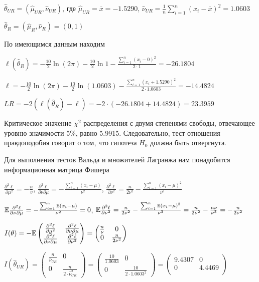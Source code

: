 \begin{problem}
\begin{sol}
$\hat{\theta}_{UR} = (\hat{\mu}_{UR}, \hat{\nu}_{UR})$, где $\hat{\mu}_{UR} = \overline{x} = -1.5290$, $\hat{\nu}_{UR} = \frac{1}{n} \sum_{i=1}^n (x_i - \overline{x})^2 = 1.0603$

$\hat{\theta}_{R} = (\hat{\mu}_{R}, \hat{\nu}_{R}) = (0,1)$

По имеющимся данным находим

$\ell(\hat{\theta}_{R}) = -\frac{10}{2} \ln(2\pi) - \frac{10}{2} \ln 1 - \frac{\sum_{i=1}^n (x_i - 0)^2}{2 \cdot 1} = -26.1804$

$\ell = -\frac{10}{2} \ln(2\pi) -  \frac{10}{2} \ln (1.0603) - \frac{\sum_{i=1}^n (x_i + 1.5290)^2}{2 \cdot 1.0603} = -14.4824$

$LR = -2(\ell(\hat{\theta}_{R}) - \ell) = -2 \cdot (-26.1804 + 14.4824) = 23.3959$

Критическое значение $\chi^2$ распределения с двумя степенями свободы, отвечающее уровню значимости 5\%, равно 5.9915. Следовательно, тест отношения правдоподобия говорит о том, что гипотеза $H_0$ должна быть отвергнута.

Для выполнения тестов Вальда и множителей Лагранжа нам понадобится информационная матрица Фишера

$\frac{\partial^2 \ell}{\partial \mu^2} = -\frac{n}{v}$, $\frac{\partial^2 \ell}{\partial \nu \partial \mu} = -\frac{\sum_{i=1}^n (x_i - \mu)}{\nu^2}$, $\frac{\partial^2 \ell}{\partial \nu^2} = \frac{n}{2\nu^2} - \frac{\sum_{i=1}^n (x_i - \mu)^2}{\nu^3}$

$\mathbb{E} \frac{\partial^2 \ell}{\partial \nu \partial \mu} = -\frac{\sum_{i=1}^n \mathbb{E}(x_i - \mu)}{\nu^2} = 0$, $\mathbb{E} \frac{\partial^2 \ell}{\partial \nu^2} = \frac{n}{2\nu^2} - \frac{\sum_{i=1}^n \mathbb{E}(x_i - \mu)^2}{\nu^3} = \frac{n}{2\nu^2} - \frac{n\nu}{\nu^3} =- \frac{n}{2\nu^2}$

$I(\theta) = -\mathbb{E} \begin{pmatrix}
\frac{\partial^2 \ell}{\partial \mu^2} & \frac{\partial^2 \ell}{\partial \nu \partial \mu} \\
\frac{\partial^2 \ell}{\partial \nu \partial \mu} & \frac{\partial^2 \ell}{\partial \nu^2} \\
\end{pmatrix} = \begin{pmatrix}
\frac{n}{\nu} & 0 \\
0 & \frac{n}{2\nu^2}
\end{pmatrix}$

$I(\hat{\theta}_{UR}) = \begin{pmatrix}
\frac{n}{\hat{\nu}_{UR}} & 0 \\
0 & \frac{n}{2 \cdot \hat{\nu}_{UR}^2}
\end{pmatrix} = \begin{pmatrix}
\frac{10}{1.0603} & 0 \\
0 & \frac{10}{2 \cdot 1.0603^2}
\end{pmatrix} = \begin{pmatrix}
9.4307 & 0 \\
0 & 4.4469 \\
\end{pmatrix}$


\end{sol}
\end{problem}
